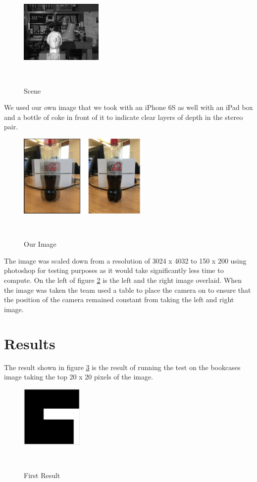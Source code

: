 \documentclass[twocolumn]{article}
\begin{document}
\begin{figure}[H]
\centering
  \includegraphics[width=40mm]{Figures/scene}
    \caption{Scene}~\label{fig:scene}
\end{figure} 

We used our own image that we took with an iPhone 6S as well with an iPad box and a bottle of coke in front of it to indicate clear layers of depth in the stereo pair. 

\begin{figure}[H]
\centering
  \includegraphics[height=40mm]{Figures/Coke_Image}
    \caption{Our Image}~\label{fig:CokeScene}
\end{figure} 

The image was scaled down from a resolution of 3024 x 4032 to 150 x 200 using photoshop for testing purposes as it would take significantly less time to compute. On the left of figure \ref{fig:CokeScene} is the left and the right image overlaid. When the image was taken the team used a table to place the camera on to ensure that the position of the camera remained constant from taking the left and right image. 



\section{Results}
\vspace{-1ex}

The result shown in figure \ref{fig:FirstResult} is the result of running the test on the bookcases image taking the top 20 x 20 pixels of the image. 

\begin{figure}[H]
\centering
  \includegraphics[height=30mm]{Figures/First_Result}
    \caption{First Result}~\label{fig:FirstResult}
\end{figure}  
\end{document}
